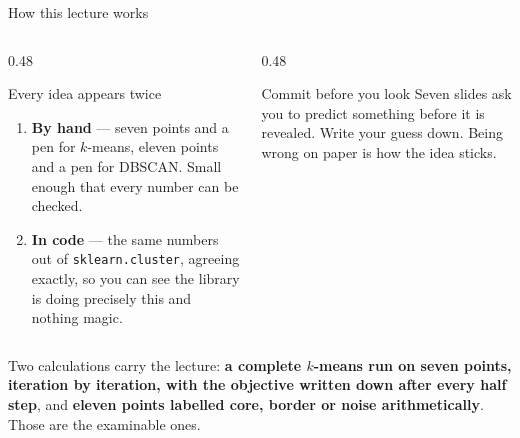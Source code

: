 \documentclass[aspectratio=169]{beamer}
\begin{document}
\begin{frame}[shrink=8]{How this lecture works}
  \begin{columns}[T]
    \begin{column}{0.48\textwidth}
      \begin{block}{Every idea appears twice}
        \begin{enumerate}
          \item \textbf{By hand} --- seven points and a pen for $k$-means,
            eleven points and a pen for DBSCAN. Small enough that every
            number can be checked.
          \item \textbf{In code} --- the same numbers out of
            \texttt{sklearn.cluster}, agreeing exactly, so you can see the
            library is doing precisely this and nothing magic.
        \end{enumerate}
      \end{block}
    \end{column}
    \begin{column}{0.48\textwidth}
      \begin{alertblock}{Commit before you look}
        Seven slides ask you to predict something before it is revealed.
        Write your guess down. Being wrong on paper is how the idea sticks.
      \end{alertblock}
    \end{column}
  \end{columns}
  \vspace{0.4em}
  \begin{center}
    \small Two calculations carry the lecture: \textbf{a complete $k$-means
    run on seven points, iteration by iteration, with the objective written
    down after every half step}, and \textbf{eleven points labelled core,
    border or noise arithmetically}. Those are the examinable ones.
  \end{center}
\end{frame}
\end{document}
